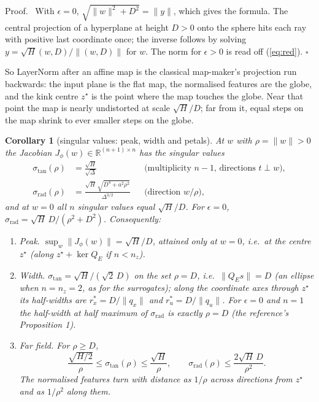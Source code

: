 \documentclass[11pt]{article}
\theoremstyle{plainnote}
\newtheorem{corollary}{Corollary}
\renewenvironment{proof}[1][Proof]{\par\noindent #1.\ }{\hfill$\square$\par}
\newcommand{\R}{\mathbb R}
\begin{document}
\begin{proof}
With $\epsilon=0$, $\sqrt{\|w\|^2+D^2}=\|y\|$, which gives the formula. The central projection of a hyperplane at height $D>0$ onto the sphere hits each ray with positive last coordinate once; the inverse follows by solving $y=\sqrt H(w,D)/\|(w,D)\|$ for $w$. The norm for $\epsilon>0$ is read off (\ref{eq:red}).
\end{proof}

So LayerNorm after an affine map is the classical map-maker's projection run backwards: the input plane is the flat map, the normalised features are the globe, and the kink centre $z^\star$ is the point where the map touches the globe. Near that point the map is nearly undistorted at scale $\sqrt H/D$; far from it, equal steps on the map shrink to ever smaller steps on the globe.

\begin{corollary}[singular values: peak, width and petals]\label{cor:sv}
At $w$ with $\rho=\|w\|>0$ the Jacobian $J_\phi(w)\in\R^{(n+1)\times n}$ has the singular values
\begin{equation}
\begin{aligned}
\sigma_{\mathrm{tan}}(\rho)&=\frac{\sqrt H}{\sqrt{\Delta}}&&\text{(multiplicity } n-1\text{, directions }t\perp w),\\
\sigma_{\mathrm{rad}}(\rho)&=\frac{\sqrt H\,\sqrt{D^4+a^2\rho^2}}{\Delta^{3/2}}&&\text{(direction }w/\rho),
\end{aligned}
\label{eq:sv}
\end{equation}
and at $w=0$ all $n$ singular values equal $\sqrt H/D$. For $\epsilon=0$, $\sigma_{\mathrm{rad}}=\sqrt H\,D/(\rho^2+D^2)$. Consequently:
\begin{enumerate}
\item[(a)] Peak. $\sup_w\|J_\phi(w)\|=\sqrt H/D$, attained only at $w=0$, i.e.\ at the centre $z^\star$ (along $z^\star+\ker Q_E$ if $n<n_z$).
\item[(b)] Width. $\sigma_{\mathrm{tan}}=\sqrt H/(\sqrt2\,D)$ on the set $\rho=D$, i.e.\ $\|Q_E s\|=D$ (an ellipse when $n=n_z=2$, as for the surrogates); along the coordinate axes through $z^\star$ its half-widths are $r^*_x=D/\|q_x\|$ and $r^*_u=D/\|q_u\|$. For $\epsilon=0$ and $n=1$ the half-width at half maximum of $\sigma_{\mathrm{rad}}$ is exactly $\rho=D$ (the reference's Proposition 1).
\item[(c)] Far field. For $\rho\ge D$,
\begin{equation}
\frac{\sqrt{H/2}}{\rho}\le\sigma_{\mathrm{tan}}(\rho)\le\frac{\sqrt H}{\rho},\qquad \sigma_{\mathrm{rad}}(\rho)\le\frac{2\sqrt H\,D}{\rho^2}.
\end{equation}
The normalised features turn with distance as $1/\rho$ across directions from $z^\star$ and as $1/\rho^2$ along them.
\end{enumerate}
\end{corollary}
\end{document}
